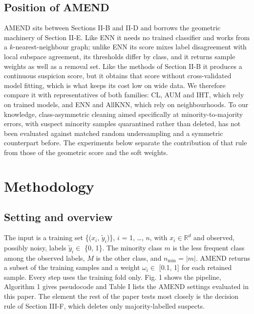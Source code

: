 \documentclass[conference]{IEEEtran}
\begin{document}
\subsection{Position of AMEND}\label{sec:position-of-amend}

AMEND sits between Sections II-B and II-D and borrows the geometric machinery of Section II-E. Like ENN it needs no trained classifier and works from a $k$-nearest-neighbour graph; unlike ENN its score mixes label disagreement with local subspace agreement, its thresholds differ by class, and it returns sample weights as well as a removal set. Like the methods of Section II-B it produces a continuous suspicion score, but it obtains that score without cross-validated model fitting, which is what keeps its cost low on wide data. We therefore compare it with representatives of both families: CL, AUM and IHT, which rely on trained models, and ENN and AllKNN, which rely on neighbourhoods. To our knowledge, class-asymmetric cleaning aimed specifically at minority-to-majority errors, with suspect minority samples quarantined rather than deleted, has not been evaluated against matched random undersampling and a symmetric counterpart before. The experiments below separate the contribution of that rule from those of the geometric score and the soft weights.

\section{Methodology}\label{sec:methodology}

\subsection{Setting and overview}\label{sec:setting-and-overview}

The input is a training set \{($x_{i}$, $\tilde{y}_{i}$)\}, $i$ = 1, \ldots, $n$, with $x_{i} \in  \mathbb{R}^{d}$ and observed, possibly noisy, labels $\tilde{y}_{i} \in $ \{0, 1\}. The minority class $m$ is the less frequent class among the observed labels, $M$ is the other class, and $n_{\mathrm{min}}$ = $|m|$. AMEND returns a subset of the training samples and a weight $\omega _{i} \in $ {[}0.1, 1{]} for each retained sample. Every step uses the training fold only. Fig. 1 shows the pipeline, Algorithm 1 gives pseudocode and Table I lists the AMEND settings evaluated in this paper. The element the rest of the paper tests most closely is the decision rule of Section III-F, which deletes only majority-labelled suspects.
\end{document}
